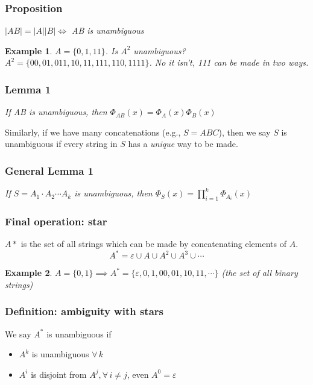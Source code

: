 \documentclass{report}
\newtheorem{ex}{Example}[section]
\begin{document}
\subsubsection{Proposition}
\begin{center}
\textit{$|AB| = |A||B| \iff$ AB is unambiguous}
\end{center}
\begin{ex}
$A = \{0, 1, 11\}$. Is $A^2$ unambiguous? $A^2 = \{00, 01, 011, 10, 11, 111, 110, 1111\}$. No it isn't, 111 can be made in two ways.
\end{ex}
\subsubsection{Lemma 1}
\begin{center}
\textit{If AB is unambiguous, then $\Phi_{AB}(x) = \Phi_A(x)\Phi_B(x)$}
\end{center}
Similarly, if we have many concatenations (e.g., $S = ABC$), then we say $S$ is unambiguous if every string in $S$ has a \textit{unique} way to be made.
\subsubsection{General Lemma 1}
\begin{center}
\textit{If $S = A_1\cdot A_2 \cdots A_k$ is unambiguous, then $\Phi_S(x) = \displaystyle\prod_{i=1}^k \Phi_{A_i}(x)$}
\end{center}
\subsubsection{Final operation: star}
$A*$ is the set of all strings which can be made by concatenating elements of $A$. 
$$A^* = \varepsilon \cup A \cup A^2 \cup A^3 \cup \cdots$$
\begin{ex}
$A = \{0, 1\} \implies A^* = \{\varepsilon, 0, 1, 00, 01, 10, 11, \cdots\}$ (the set of all binary strings) 
\end{ex}
\subsubsection{Definition: ambiguity with stars}
We say $A^*$ is unambiguous if
\begin{itemize}
\item $A^k$ is unambiguous $\forall \, k$
\item $A^i$ is disjoint from $A^j, \forall \, i \neq j$, even $A^0 = \varepsilon$
\end{itemize}
\end{document}
